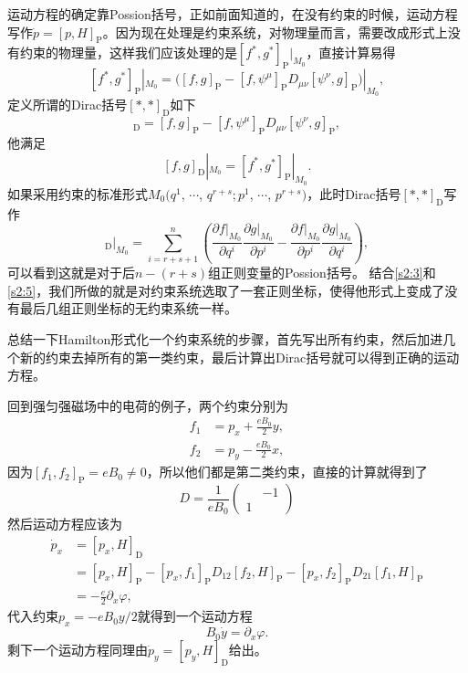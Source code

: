 运动方程的确定靠Possion括号，正如前面知道的，在没有约束的时候，运动方程写作$\dot{p}=[p,H]_{\mathrm{P}}$。因为现在处理是约束系统，对物理量而言，需要改成形式上没有约束的物理量，这样我们应该处理的是$[f^*,g^*]_{\mathrm{P}}|_{M_0}$，直接计算易得
\[
	[f^*,g^*]_{\mathrm{P}}|_{M_0}=\bigl([f,g]_{\mathrm{P}}-[f,\psi^\mu]_{\mathrm{P}}D_{\mu\nu}[\psi^\nu,g]_{\mathrm{P}}\bigr)|_{M_0},
\]
定义所谓的Dirac括号$[*,*]_{\mathrm{D}}$如下
\begin{equation}
	[f,g]_{\mathrm{D}}=[f,g]_{\mathrm{P}}-[f,\psi^\mu]_{\mathrm{P}}D_{\mu\nu}[\psi^\nu,g]_{\mathrm{P}},
	\label{s2:4}
\end{equation}
他满足
\[
	[f,g]_{\mathrm{D}}|_{M_0}=[f^*,g^*]_{\mathrm{P}}|_{M_0}.
\]
如果采用约束的标准形式$M_0(q^1$, $\cdots$, $q^{r+s};p^1$, $\cdots$, $p^{r+s})$，此时Dirac括号$[*,*]_{\mathrm{D}}$写作
\begin{equation}
	[f,g]_{\mathrm{D}}|_{M_0}=\sum_{i=r+s+1}^{n}\left(\frac{\partial f|_{M_0}}{\partial q^i}\frac{\partial g|_{M_0}}{\partial p^i}-\frac{\partial f|_{M_0}}{\partial p^i}\frac{\partial g|_{M_0}}{\partial q^i}\right),
	\label{s2:5}
\end{equation}
可以看到这就是对于后$n-(r+s)$组正则变量的Possion括号。
结合\eqref{s2:3}和\eqref{s2:5}，我们所做的就是对约束系统选取了一套正则坐标，使得他形式上变成了没有最后几组正则坐标的无约束系统一样。

总结一下Hamilton形式化一个约束系统的步骤，首先写出所有约束，然后加进几个新的约束去掉所有的第一类约束，最后计算出Dirac括号就可以得到正确的运动方程。

回到强匀强磁场中的电荷的例子，两个约束分别为
\begin{align*}
	f_1&=p_x+\frac{eB_0}{2}y,\\
	f_2&=p_y-\frac{eB_0}{2}x,
\end{align*}
因为$[f_1,f_2]_{\mathrm{P}}=eB_0\neq 0$，所以他们都是第二类约束，直接的计算就得到了
\[
	D=\frac{1}{eB_0}\begin{pmatrix}
	&-1\\
	1&
	\end{pmatrix}
\]
然后运动方程应该为
\begin{align*}
	\dot{p}_x&=[p_x,H]_{\mathrm{D}}\\
	&=[p_x,H]_{\mathrm{P}}-[p_x,f_1]_{\mathrm{P}}D_{12}[f_2,H]_{\mathrm{P}}-[p_x,f_2]_{\mathrm{P}}D_{21}[f_1,H]_{\mathrm{P}}\\
	&=-\frac{e}{2}\partial_x \varphi,
\end{align*}
代入约束$p_x=-eB_0y/2$就得到一个运动方程
\[
	B_0\dot{y}=\partial_x \varphi.
\]
剩下一个运动方程同理由$\dot{p}_y=[p_y,H]_{\mathrm{D}}$给出。

